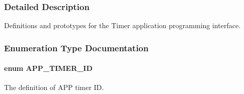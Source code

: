 \subsubsection{Detailed Description}
Definitions and prototypes for the Timer application programming interface. 



\subsubsection{Enumeration Type Documentation}
\paragraph[{\texorpdfstring{A\+P\+P\+\_\+\+T\+I\+M\+E\+R\+\_\+\+ID}{APP_TIMER_ID}}]{\setlength{\rightskip}{0pt plus 5cm}enum {\bf A\+P\+P\+\_\+\+T\+I\+M\+E\+R\+\_\+\+ID}}\hypertarget{group___t_i_m_e_r_ga066b1254d4f15cdbcfecca34eff53308}{}\label{group___t_i_m_e_r_ga066b1254d4f15cdbcfecca34eff53308}


The definition of A\+PP timer ID. 

